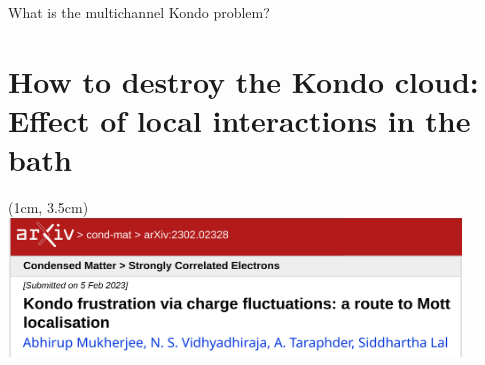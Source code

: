 \documentclass[10pt,aspectratio=169]{beamer}
\begin{document}
\begin{frame}{What is the multichannel Kondo problem?}
\end{frame}

\section{How to destroy the Kondo cloud:\\
Effect of local interactions in the bath\vspace*{20pt}}
\begin{textblock*}{\textwidth}(1cm, 3.5cm)
\includegraphics[width=0.9\textwidth]{esiam_arxiv.pdf}\\
\end{textblock*}
\subsection{~}
\end{document}
